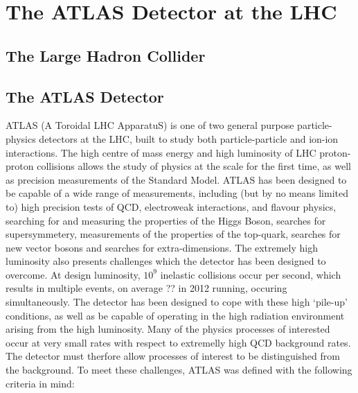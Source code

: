 \graphicspath{{Chapters/Detector/Figures/}}
\chapter{The ATLAS Detector at the LHC}
\label{chap:Detector}

\section{The Large Hadron Collider}

\section{The ATLAS Detector}

ATLAS (A Toroidal LHC ApparatuS) is one of two general purpose particle-physics
detectors at the LHC, built to study both particle-particle and ion-ion
interactions. The high centre of mass energy and high luminosity of LHC proton-proton collisions
allows the study of physics at the \tev scale for the first time, as well as
precision measurements of the Standard Model. ATLAS has been designed to be
capable of a wide range of measurements, including (but by no means limited to)
high precision tests of QCD, electroweak interactions, and flavour physics, searching for and measuring
the properties of the Higgs Boson, searches for supersymmetery, measurements
of the properties of the top-quark, searches for new vector bosons and searches
for extra-dimensions. The extremely high luminosity also presents challenges which
the detector has been designed to overcome. At design luminosity, $10^9$
inelastic collisions occur per second, which results in multiple events, on average ?? in 2012 running, occuring
simultaneously. The detector has been designed to cope with these high
`pile-up' conditions, as well as be capable of operating in the high radiation
environment arising from the high luminosity. Many of the physics processes of interested occur at very
small rates with respect to extremelly high QCD background rates. The detector
must therfore allow processes of interest to be distinguished from the
background. To meet these challenges, ATLAS was defined with the following
criteria in mind:


